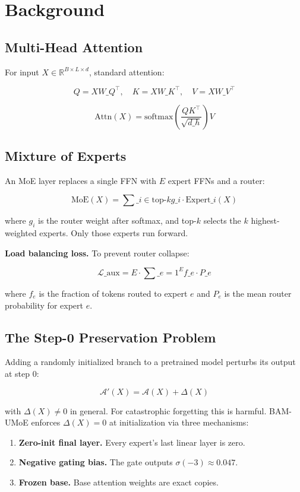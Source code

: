 \section{Background}

\subsection{Multi-Head Attention}

For input $X \in \mathbb{R}^{B \times L \times d}$, standard attention:

\[
Q = X W\_Q^\top, \quad K = X W\_K^\top, \quad V = X W\_V^\top
\]

\[
\text{Attn}(X) = \text{softmax}\!\left(\frac{Q K^\top}{\sqrt{d\_h}}\right) V
\]

\subsection{Mixture of Experts}

An MoE layer replaces a single FFN with $E$ expert FFNs and a router:

\[
\text{MoE}(X) = \sum\_{i \in \text{top-}k} g\_i \cdot \text{Expert}\_i(X)
\]

where $g_i$ is the router weight after softmax, and top-$k$ selects the 
$k$ highest-weighted experts. Only those experts run forward.

\textbf{Load balancing loss.} To prevent router collapse:

\[
\mathcal{L}\_\text{aux} = E \cdot \sum\_{e=1}^{E} f\_e \cdot P\_e
\]

where $f_e$ is the fraction of tokens routed to expert $e$ and $P_e$ is the 
mean router probability for expert $e$.

\subsection{The Step-0 Preservation Problem}

Adding a randomly initialized branch to a pretrained model perturbs its 
output at step 0:

\[
\mathcal{A}'(X) = \mathcal{A}(X) + \Delta(X)
\]

with $\Delta(X) \neq 0$ in general. For catastrophic forgetting this is 
harmful. BAM-UMoE enforces $\Delta(X) = 0$ at initialization via three 
mechanisms:

\begin{enumerate}
\item \textbf{Zero-init final layer.} Every expert's last linear layer is zero.
\item \textbf{Negative gating bias.} The gate outputs $\sigma(-3) \approx 0.047$.
\item \textbf{Frozen base.} Base attention weights are exact copies.

\end{enumerate}
